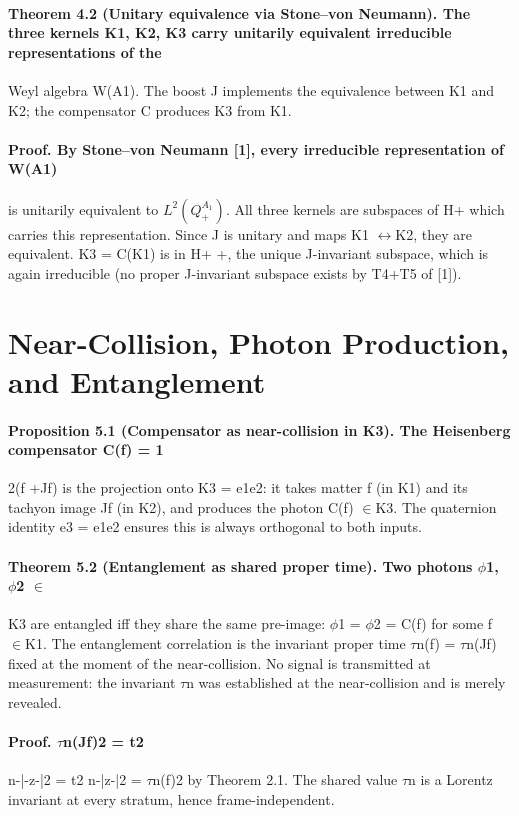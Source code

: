 \documentclass[12pt,a4paper]{article}
\begin{document}
\paragraph*{Theorem 4.2 (Unitary equivalence via Stone--von Neumann). The three kernels K1, K2, K3 carry unitarily equivalent irreducible representations of the}
Weyl algebra W(A1). The boost J implements the equivalence between K1 and K2; the compensator C produces K3 from K1.
\paragraph*{Proof. By Stone--von Neumann [1], every irreducible representation of W(A1)}
is unitarily equivalent to $L^2(Q_+^{A_1})$. All three kernels are subspaces of H+ which carries this representation. Since J is unitary and maps K1 $\leftrightarrow$K2, they are equivalent. K3 = C(K1) is in H+ +, the unique J-invariant subspace, which is again irreducible (no proper J-invariant subspace exists by T4+T5 of [1]).

\section{Near-Collision, Photon Production, and Entanglement}
\paragraph*{Proposition 5.1 (Compensator as near-collision in K3). The Heisenberg compensator C(f) = 1}
2(f +Jf) is the projection onto K3 = e1e2: it takes matter f (in K1) and its tachyon image Jf (in K2), and produces the photon C(f) $\in$K3. The quaternion identity e3 = e1e2 ensures this is always orthogonal to both inputs.
\paragraph*{Theorem 5.2 (Entanglement as shared proper time). Two photons $\phi$1, $\phi$2 $\in$}
K3 are entangled iff they share the same pre-image: $\phi$1 = $\phi$2 = C(f) for some f $\in$K1. The entanglement correlation is the invariant proper time $\tau$n(f) = $\tau$n(Jf) fixed at the moment of the near-collision. No signal is transmitted at measurement: the invariant $\tau$n was established at the near-collision and is merely revealed.
\paragraph*{Proof. $\tau$n(Jf)2 = t2}
n-|-z-|2 = t2 n-|z-|2 = $\tau$n(f)2 by Theorem 2.1. The shared value $\tau$n is a Lorentz invariant at every stratum, hence frame-independent.
\end{document}
